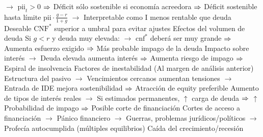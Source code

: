\documentclass{nuevotema}
\begin{document}
\begin{esquemal}
				\4[] $\to$ $\text{pii}_t > 0$
				\4[] $\then$ Déficit sólo sostenible si economía acreedora
				\4[] $\then$ Déficit sostenible hasta límite $\text{pii}\cdot \frac{g-r}{1+g}$
				\4[] $\to$ Interpretable como I menos rentable que deuda
				\4[$\then$] Deseable $\text{CNF}^*$ superior a umbral para evitar ajustes
				\4 Efectos del volumen de deuda
				\4[] Si $g<r$ y deuda muy elevada:
				\4[] $\to$ $\text{cnf}^*$ deberá ser muy grande
				\4[] $\then$ Aumenta esfuerzo exigido
				\4[] $\then$ Más probable impago de la deuda
				\4[] Impacto sobre interés
				\4[] $\to$ Deuda elevada aumenta interés
				\4[] $\then$ Aumenta riesgo de impago
				\4[] $\then$ Espiral de insolvencia
				\4 Factores de inestabilidad
				\4[] (Al margen de análisis anterior)
				\4[] Estructura del pasivo
				\4[] $\to$ Vencimientos cercanos aumentan tensiones
				\4[] $\to$ Entrada de IDE mejora sostenibilidad
				\4[] $\then$ Atracción de equity preferible
				\4[] Aumento de tipos de interés reales
				\4[] $\to$ Si estimados permanentes, $\uparrow$ carga de deuda
				\4[] $\then$ $\uparrow$ Probabilidad de impago
				\4[] $\then$ Posible corte de financiación
				\4[] Cortes de acceso a financiación
				\4[] $\to$ Pánico financiero
				\4[] $\to$ Guerras, problemas jurídicos/políticos
				\4[] $\to$ Profecía autocumplida (múltiples equilibrios)
				\4[] Caída del crecimiento/recesión


\end{esquemal}
\end{document}
